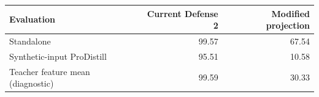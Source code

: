 \begin{tabular}{lrr}
\toprule
Evaluation & Current Defense 2 & Modified projection \\
\midrule
Standalone & 99.57 & 67.54 \\
Synthetic-input ProDistill & 95.51 & 10.58 \\
Teacher feature mean (diagnostic) & 99.59 & 30.33 \\
\bottomrule
\end{tabular}
